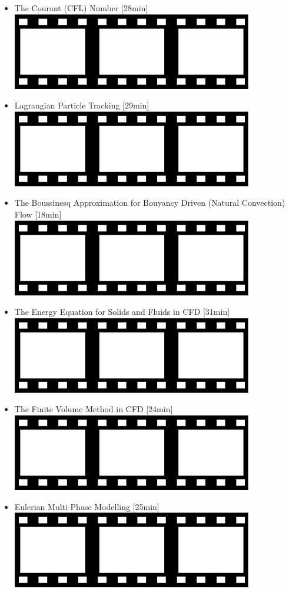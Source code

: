 \begin{itemize}
\item The Courant (CFL) Number [28min]
      \href{https://www.youtube.com/watch?v=WBWY46ynRk0}{\includegraphics[width=.8cm]{images/pictograms/film.png}}

\item Lagrangian Particle Tracking [29min]
      \href{https://www.youtube.com/watch?v=jdq6puyvQ7E}{\includegraphics[width=.8cm]{images/pictograms/film.png}}

\item The Boussinesq Approximation for Bouyancy Driven (Natural Convection) Flow [18min]
      \href{https://www.youtube.com/watch?v=onKiVbKSoXw}{\includegraphics[width=.8cm]{images/pictograms/film.png}}

\item The Energy Equation for Solids and Fluids in CFD [31min]
      \href{https://www.youtube.com/watch?v=z8dZHze_EPo}{\includegraphics[width=.8cm]{images/pictograms/film.png}}

\item The Finite Volume Method in CFD [24min] 
      \href{https://www.youtube.com/watch?v=E9_kyXjtRHc}{\includegraphics[width=.8cm]{images/pictograms/film.png}}

\item Eulerian Multi-Phase Modelling [25min]
      \href{https://www.youtube.com/watch?v=6BJauDTpCmo}{\includegraphics[width=.8cm]{images/pictograms/film.png}}

\end{itemize}


